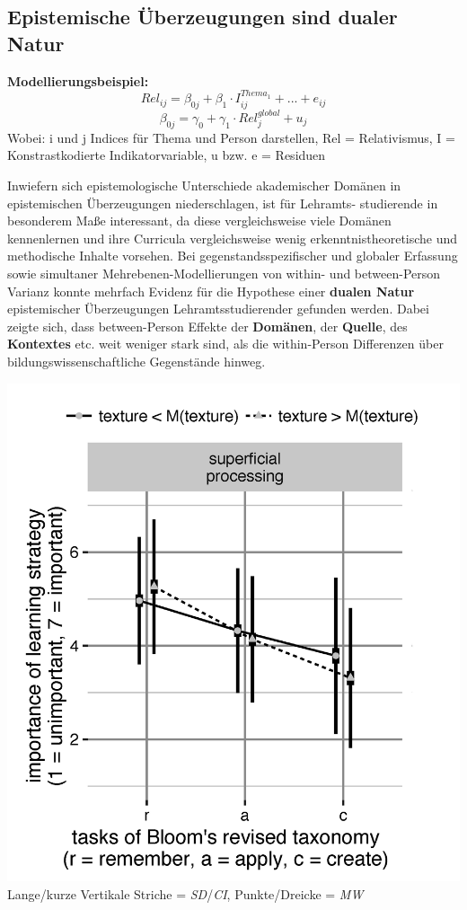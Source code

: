 \documentclass[]{tufte-handout}
\begin{document}
\subsection{Epistemische Überzeugungen sind dualer
Natur}\label{epistemische-uberzeugungen-sind-dualer-natur}

\begin{marginfigure}
\textbf{Modellierungsbeispiel:}
\[Rel_{ij} = \beta_{0j} + \beta_{1} \cdot  I^{Thema_1}_{ij} + ... + e_{ij}\]
\[\beta_{0j} = \gamma_{0} + \gamma_{1} \cdot Rel^{global}_{j} + u_{j}\]
Wobei: i und j Indices für Thema und Person darstellen, Rel =
Relativismus, I = Konstrastkodierte Indikatorvariable, u bzw. e =
Residuen
\end{marginfigure}

Inwiefern sich epistemologische Unterschiede akademischer Domänen in
epistemischen Überzeugungen niederschlagen, ist für Lehramts-
studierende in besonderem Maße interessant, da diese vergleichsweise
viele Domänen kennenlernen und ihre Curricula vergleichsweise wenig
erkenntnistheoretische und methodische Inhalte vorsehen. Bei
gegenstandsspezifischer und globaler Erfassung sowie simultaner
Mehrebenen-Modellierungen von within- und between-Person Varianz konnte
mehrfach Evidenz für die Hypothese einer \textbf{dualen Natur}
epistemischer Überzeugungen Lehramtsstudierender gefunden werden. Dabei
zeigte sich, dass between-Person Effekte der \textbf{Domänen}, der
\textbf{Quelle}, des \textbf{Kontextes} etc. weit weniger stark sind,
als die within-Person Differenzen über bildungswissenschaftliche
Gegenstände hinweg.

\begin{marginfigure}
\includegraphics{../Img/Kalibrierung_sup4.png} Lange/kurze Vertikale
Striche = \emph{SD}/\emph{CI}, Punkte/Dreicke = \emph{MW}
\end{marginfigure}
\end{document}
